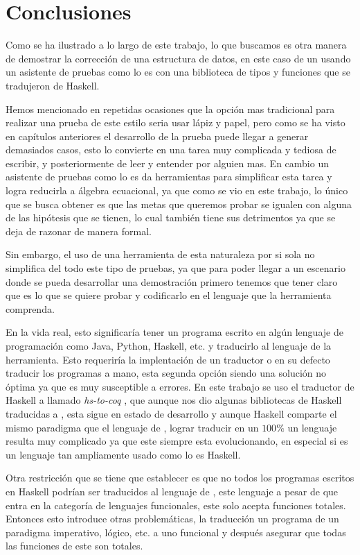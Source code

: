 \chapter{Conclusiones}
Como se ha ilustrado a lo largo de este trabajo, lo que buscamos es otra manera de demostrar la 
correcci\'on de una estructura de datos, en este caso de un {\arn} usando un asistente de pruebas 
como lo es {\coq} con una biblioteca de tipos y funciones que se tradujeron de Haskell.

Hemos mencionado en repetidas ocasiones que la opci\'on mas tradicional para realizar una prueba de 
este estilo seria usar lápiz y papel, pero como se ha visto en capítulos anteriores el desarrollo de
la prueba puede llegar a generar demasiados casos, esto lo convierte en una tarea muy complicada y 
tediosa de escribir, y posteriormente de leer y entender por alguien mas. En cambio un asistente de 
pruebas como lo es {\coq} da herramientas para simplificar esta tarea y logra reducirla a álgebra 
ecuacional, ya que como se vio en este trabajo, lo \'unico que se busca obtener es que las metas que 
queremos probar se igualen con alguna de las hip\'otesis que se tienen, lo cual también tiene sus 
detrimentos ya que se deja de razonar de manera formal.

Sin embargo, el uso de una herramienta de esta naturaleza por si sola no simplifica del todo este
tipo de pruebas, ya que para poder llegar a un escenario donde se pueda desarrollar una 
demostraci\'on primero tenemos que tener claro que es lo que se quiere probar y codificarlo en el 
lenguaje que la herramienta comprenda.

En la vida real, esto significaría tener un programa escrito en algún lenguaje de programaci\'on
como Java, Python, Haskell, etc. y traducirlo al lenguaje de la herramienta. Esto requeriría la
implentaci\'on de un traductor o en su defecto traducir los programas a mano, esta segunda opci\'on
siendo una soluci\'on no \'optima ya que es muy susceptible a errores. En este trabajo se uso el
traductor de Haskell a {\coq} llamado \textit{hs-to-coq} \cite{thrc}, que aunque nos dio algunas 
bibliotecas de Haskell traducidas a {\coq}, esta sigue en estado de desarrollo y aunque Haskell 
comparte el mismo paradigma que el lenguaje de {\coq}, lograr traducir en un $100\%$ un lenguaje 
resulta muy complicado ya que este siempre esta evolucionando, en especial si es un lenguaje tan 
ampliamente usado como lo es Haskell.

Otra restricci\'on que se tiene que establecer es que no todos los programas escritos en Haskell 
podrían ser traducidos al lenguaje de {\coq}, este lenguaje a pesar de que entra en la categoría de 
lenguajes funcionales, este solo acepta funciones totales. Entonces esto introduce otras 
problemáticas, la traducción un programa de un paradigma imperativo, l\'ogico, etc. a uno funcional 
y después asegurar que todas las funciones de este son totales.


